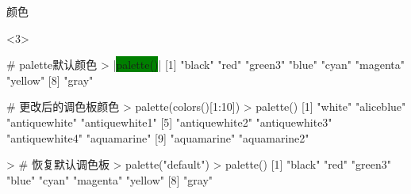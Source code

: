\documentclass{beamerthemeMono}
\begin{document}
\begin{frame}[t,fragile]{\subsecname}{颜色}
\begin{overlayarea}{\textwidth}{\textheight}
\begin{onlyenv}<3>
\begin{rcode}
# palette默认颜色
> |\colorbox{green}{palette()}|
[1] "black"   "red"     "green3"  "blue"    "cyan"    "magenta" "yellow" 
[8] "gray" 

# 更改后的调色板颜色
> palette(colors()[1:10])
> palette()
 [1] "white"         "aliceblue"     "antiquewhite"  "antiquewhite1"
 [5] "antiquewhite2" "antiquewhite3" "antiquewhite4" "aquamarine"   
 [9] "aquamarine"    "aquamarine2"  

> # 恢复默认调色板
> palette("default")
> palette()
[1] "black"   "red"     "green3"  "blue"    "cyan"    "magenta" "yellow" 
[8] "gray" 
\end{rcode}
\end{onlyenv}
\end{overlayarea}  
\end{frame}
\end{document}
